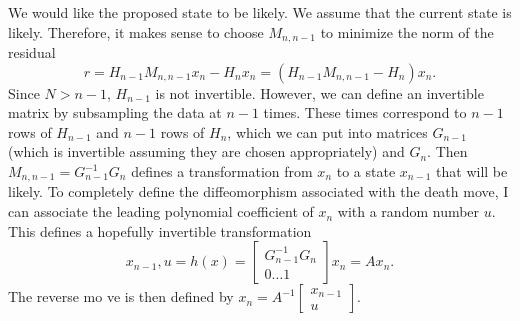 \documentclass[11pt]{article}
\begin{document}
We would like the proposed state to be likely. 
We assume that the current state is likely. 
Therefore, it makes sense to choose $M_{n, n-1}$ to minimize the norm of the residual
\begin{equation}
	r = H_{n-1} M_{n, n-1} x_n - H_{n} x_n = (H_{n-1} M_{n, n-1} - H_n) x_n . 
\end{equation}
Since $N > {n-1}$, $H_{n-1}$ is not invertible.
However, we can define an invertible matrix by subsampling the data at $n-1$ times.
These times correspond to $n-1$ rows of $H_{n-1}$ and $n-1$ rows of $H_n$, which we can put into matrices $G_{n-1}$ (which is invertible assuming they are chosen appropriately) and $G_n$. 
Then $M_{n,n-1} = G_{n-1}^{-1} G_n$ defines a transformation from $x_n$ to a state $x_{n-1}$ that will be likely. 
To completely define the diffeomorphism associated with the death move, I can associate the leading polynomial coefficient of $x_n$ with a random number $u$. 
This defines a hopefully invertible transformation
\begin{equation}
	x_{n-1}, u = h(x) = \begin{bmatrix} G_{n-1}^{-1} G_n \\ 0 \dots 1 \end{bmatrix} x_n = A x_n . 
\end{equation}
The reverse mo
ve is then defined by $ x_{n} = A^{-1} \begin{bmatrix} x_{n-1} \\ u \end{bmatrix}$. 
\end{document}
